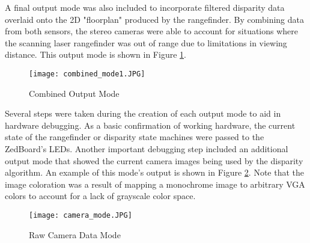 \par
A final output mode was also included to incorporate filtered disparity data overlaid onto the 2D "floorplan" produced by the rangefinder. By combining data from both sensors, the stereo cameras were able to account for situations where the scanning laser rangefinder was out of range due to limitations in viewing distance. This output mode is shown in Figure \ref{combinedOut}.
\par
\begin{figure}[H]
	\centerline{
	\texttt{[image: combined\_mode1.JPG]}
	}
	\caption{Combined Output Mode}
	\label{combinedOut}
\end{figure}
\par
Several steps were taken during the creation of each output mode to aid in hardware debugging. As a basic confirmation of working hardware, the current state of the rangefinder or disparity state machines were passed to the ZedBoard's LEDs. Another important debugging step included an additional output mode that showed the current camera images being used by the disparity algorithm. An example of this mode's output is shown in Figure \ref{camOutMode}. Note that the image coloration was a result of mapping a monochrome image to arbitrary VGA colors to account for a lack of grayscale color space.
\par
\begin{figure}[H]
	\centerline{
	\texttt{[image: camera\_mode.JPG]}
	}
	\caption{Raw Camera Data Mode}
	\label{camOutMode}
\end{figure}



